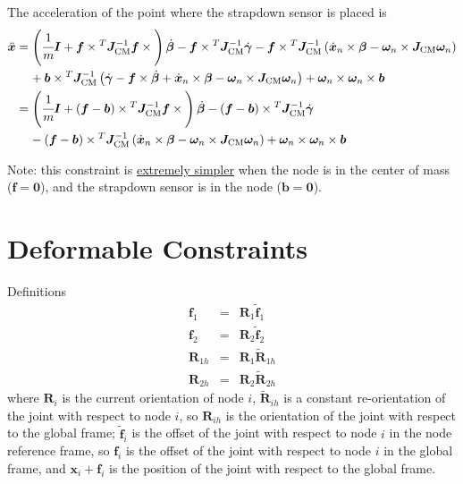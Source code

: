 \documentclass[10pt,fleqn,subeqn]{report}
\newcommand{\T}[1]{\bm{#1}}
\newcommand{\TT}[1]{\bm{#1}}
\begin{document}
The acceleration of the point where the strapdown sensor is placed is
\begin{align}
	\ddot{\T{x}}
	&=
	\plbr{
		\cfrac{1}{m} \TT{I}
		+
		\T{f} \times{}^T \TT{J}_\text{CM}^{-1} \T{f}\times{}
	} \dot{\T{\beta}}
	-
	\T{f}\times{}^T \TT{J}_\text{CM}^{-1} \dot{\T{\gamma}}
	-
	\T{f}\times{}^T \TT{J}_\text{CM}^{-1} \plbr{
		\dot{\T{x}}_n \times \T{\beta}
		-
		\T{\omega}_n \times \TT{J}_\text{CM} \T{\omega}_n
	}
	\nonumber \\ &\mbox{\hphantom{= }}
	+ \T{b}\times{}^T \TT{J}_\text{CM}^{-1} \plbr{
		\dot{\T{\gamma}}
		-
		\T{f}\times\dot{\T{\beta}}
		+
		\dot{\T{x}}_n \times \T{\beta}
		-
		\T{\omega}_n \times \TT{J}_\text{CM} \T{\omega}_n
	}
	+
	\T{\omega}_n \times \T{\omega}_n \times \T{b}
	\nonumber \\
	&=
	\plbr{
		\cfrac{1}{m} \TT{I}
		+
		\plbr{\T{f} - \T{b}}\times{}^T \TT{J}_\text{CM}^{-1} \T{f}\times{}
	} \dot{\T{\beta}}
	-
	\plbr{\T{f} - \T{b}}\times{}^T \TT{J}_\text{CM}^{-1} \dot{\T{\gamma}}
	\nonumber \\ &\mbox{\hphantom{= }}
	-
	\plbr{\T{f} - \T{b}}\times{}^T \TT{J}_\text{CM}^{-1} \plbr{
		\dot{\T{x}}_n \times \T{\beta}
		-
		\T{\omega}_n \times \TT{J}_\text{CM} \T{\omega}_n
	}
	+
	\T{\omega}_n \times \T{\omega}_n \times \T{b}
\end{align}

Note: this constraint is \underline{extremely simpler}
when the node is in the center of mass ($\T{f} = \T{0}$),
and the strapdown sensor is in the node ($\T{b} = \T{0}$).







\section{Deformable Constraints}
Definitions
\begin{eqnarray*}
	\T{f}_1 & = & \T{R}_1 \tilde{\T{f}}_1 \\
	\T{f}_2 & = & \T{R}_2 \tilde{\T{f}}_2 \\
	\T{R}_{1h} & = & \T{R}_1 \tilde{\T{R}}_{1h} \\
	\T{R}_{2h} & = & \T{R}_2 \tilde{\T{R}}_{2h}
\end{eqnarray*}
where $\T{R}_i$ is the current orientation of node $i$, 
$\tilde{\T{R}}_{ih}$ is a constant re-orientation of the joint
with respect to node $i$, so $\T{R}_{ih}$ is the orientation
of the joint with respect to the global frame;
$\tilde{\T{f}}_i$ is the offset of the joint with respect to
node $i$ in the node reference frame, so $\T{f}_i$ is the offset 
of the joint with respect to node $i$ in the global frame, and
$\T{x}_i+\T{f}_i$ is the position of the joint with respect 
to the global frame.
\end{document}
